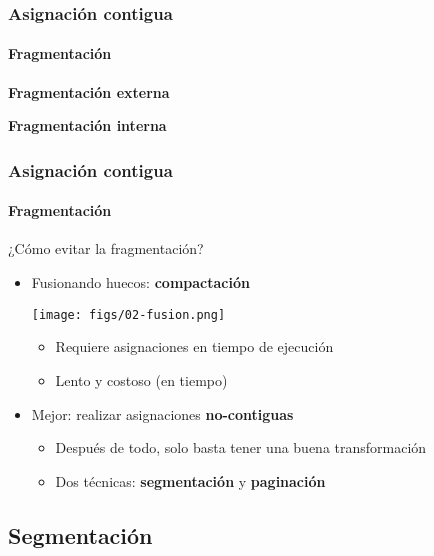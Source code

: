 \documentclass[letter]{beamer}
\begin{document}
\begin{frame}
  \frametitle{Asignación contigua}
  \framesubtitle{Fragmentación}

  \begin{block}{{\bf Fragmentación externa}}
  \end{block}
    
  \begin{block}{{\bf Fragmentación interna}}

  \end{block}

    
\end{frame}
\begin{frame}
  \frametitle{Asignación contigua}
  \framesubtitle{Fragmentación}

  ¿Cómo evitar la fragmentación?
  
  \begin{itemize}
    \item<2-> Fusionando huecos: {\bf compactación}
      \begin{center}
        \texttt{[image: figs/02-fusion.png]}
      \end{center}
      \begin{itemize}
		\item Requiere asignaciones en tiempo de ejecución
        \item Lento y costoso (en tiempo)
      \end{itemize}
    \item<3-> Mejor: realizar asignaciones {\bf no-contiguas}
      \begin{itemize}
        \item<4-> Después de todo, solo basta tener una buena transformación
        \item<4-> Dos técnicas: {\bf segmentación} y {\bf paginación}
      \end{itemize}
  \end{itemize}

\end{frame}
\subsection{Segmentación}
\end{document}

